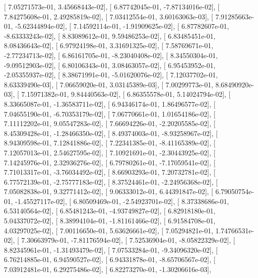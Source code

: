 \documentclass{article}
\begin{document}
       [  7.05271573e-01,   3.45668443e-02],
       [  6.87742045e-01,  -7.87134016e-02],
       [  7.84275608e-01,   2.49285819e-02],
       [  7.03412554e-01,   3.60163063e-03],
       [  7.91285663e-01,  -5.62344894e-02],
       [  7.14592114e-01,  -1.91909625e-02],
       [  6.87782607e-01,  -8.63333243e-02],
       [  8.83089612e-01,   9.59486253e-02],
       [  6.83485451e-01,   8.08436643e-02],
       [  6.97924198e-01,   3.31691325e-02],
       [  7.58769671e-01,  -2.77234713e-02],
       [  6.86161705e-01,  -8.23040408e-02],
       [  8.34550304e-01,  -9.09512903e-02],
       [  6.80106343e-01,   3.08463057e-02],
       [  6.95453952e-01,  -2.05355937e-02],
       [  8.38671991e-01,  -5.01620076e-02],
       [  7.12037702e-01,   8.63339490e-03],
       [  7.06659020e-01,   3.03145389e-03],
       [  7.00299773e-01,   8.68490920e-03],
       [  7.15971382e-01,   9.84440563e-02],
       [  6.86355578e-01,   5.14024794e-02],
       [  8.33665087e-01,  -1.36583711e-02],
       [  6.94346174e-01,   1.86496577e-02],
       [  7.04655190e-01,  -6.70353179e-02],
       [  7.06770661e-01,   1.01654186e-02],
       [  7.11112202e-01,   9.05547283e-02],
       [  7.66694226e-01,  -2.20205585e-02],
       [  8.45309428e-01,  -1.28466350e-02],
       [  8.49374003e-01,  -8.93258967e-02],
       [  8.94309598e-01,   7.12841886e-02],
       [  7.22341385e-01,  -8.41165389e-02],
       [  7.12057013e-01,   2.54627595e-02],
       [  7.10921691e-01,  -2.30443925e-02],
       [  7.14245976e-01,   2.32936276e-02],
       [  6.79780261e-01,  -7.17059541e-02],
       [  7.71013317e-01,  -3.76034492e-02],
       [  8.66903293e-01,   7.20732781e-02],
       [  6.77572139e-01,  -2.75777183e-02],
       [  8.37524461e-01,  -2.24956368e-02],
       [  7.05082838e-01,   9.32771412e-02],
       [  9.06333012e-01,   6.44391847e-02],
       [  6.79050754e-01,  -1.45527117e-02],
       [  6.80509469e-01,  -2.54923701e-02],
       [  8.37338686e-01,   6.53140564e-02],
       [  6.85481243e-01,  -4.93749827e-02],
       [  6.82918180e-01,   5.04337072e-02],
       [  8.38994104e-01,  -1.81161466e-02],
       [  6.91584708e-01,   4.03297025e-02],
       [  7.00116650e-01,   5.63626661e-02],
       [  7.05294821e-01,   1.74766531e-02],
       [  7.30663979e-01,  -7.81176594e-02],
       [  7.52536904e-01,  -8.05822329e-02],
       [  8.82345961e-01,  -1.31493479e-02],
       [  7.07533284e-01,  -9.34096320e-02],
       [  6.76214885e-01,   6.94590527e-02],
       [  6.94331878e-01,  -8.65706567e-02],
       [  7.03912481e-01,   6.29275486e-02],
       [  6.82273270e-01,  -1.30206616e-03],
\end{document}
